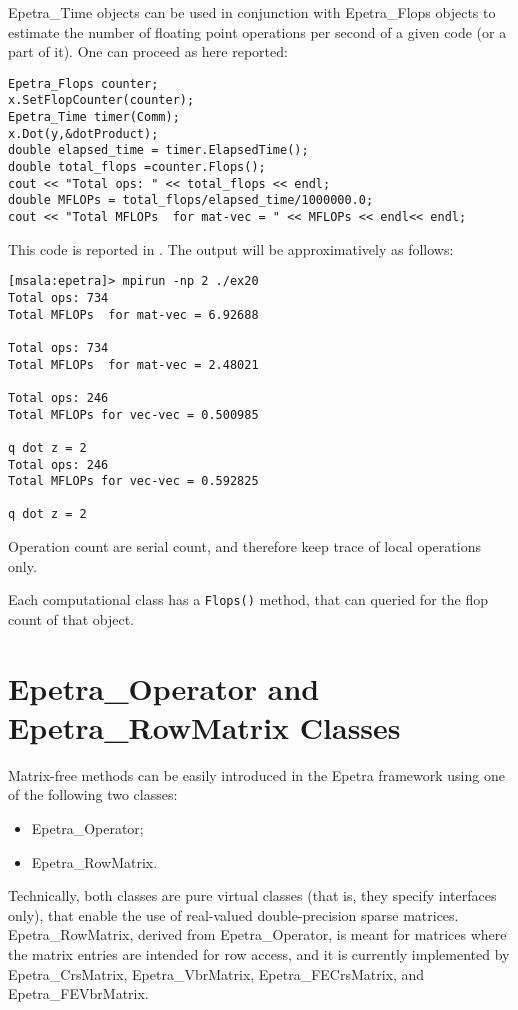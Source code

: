 Epetra\_Time objects can be used in conjunction with Epetra\_Flops
objects to estimate the number of floating point operations per second
of a given code (or a part of it). One can proceed as here reported:
\begin{verbatim}
Epetra_Flops counter;
x.SetFlopCounter(counter);
Epetra_Time timer(Comm);
x.Dot(y,&dotProduct);
double elapsed_time = timer.ElapsedTime();
double total_flops =counter.Flops();
cout << "Total ops: " << total_flops << endl;
double MFLOPs = total_flops/elapsed_time/1000000.0;
cout << "Total MFLOPs  for mat-vec = " << MFLOPs << endl<< endl;
\end{verbatim}
This code is reported in . The output will be
approximatively as follows:
\begin{verbatim}
[msala:epetra]> mpirun -np 2 ./ex20
Total ops: 734
Total MFLOPs  for mat-vec = 6.92688

Total ops: 734
Total MFLOPs  for mat-vec = 2.48021

Total ops: 246
Total MFLOPs for vec-vec = 0.500985

q dot z = 2
Total ops: 246
Total MFLOPs for vec-vec = 0.592825

q dot z = 2
\end{verbatim}

\begin{remark} Operation count are serial count, and therefore keep
  trace of local operations only.
\end{remark}

\begin{remark}
  Each computational class has a \verb!Flops()! method, that can queried
  for the flop count of that object.
\end{remark}



\section{Epetra\_Operator and Epetra\_RowMatrix Classes}
\label{sec:operator}

Matrix-free methods can be easily introduced in the Epetra framework
using one of the following two classes:
\begin{itemize}
\item Epetra\_Operator;
\item Epetra\_RowMatrix.
\end{itemize}
Technically, both classes are pure virtual classes (that is, they
specify interfaces only), that enable the use of real-valued
double-precision sparse matrices. Epetra\_RowMatrix, derived from
Epetra\_Operator, is meant for matrices where the matrix entries are
intended for row access, and it is currently implemented by
Epetra\_CrsMatrix, Epetra\_VbrMatrix, Epetra\_FECrsMatrix, and
Epetra\_FEVbrMatrix.

